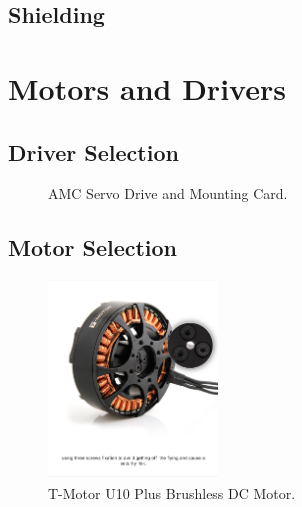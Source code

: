\subsection{Shielding}
\section{Motors and Drivers}

\subsection{Driver Selection}

\begin{figure}
\centering
{}
\caption{AMC Servo Drive and Mounting Card.}
\label{fig:AMC Servo Drive and Mounting Card}
\end{figure}

\subsection{Motor Selection}

\begin{figure}
\centering
\includegraphics[clip, trim=0cm 5cm 0cm 2cm, width=0.4\textwidth]{images/motor/TMotorU10Plus} 
\caption{T-Motor U10 Plus Brushless DC Motor.}
\label{fig:TMotorU10Plus}
\end{figure}

